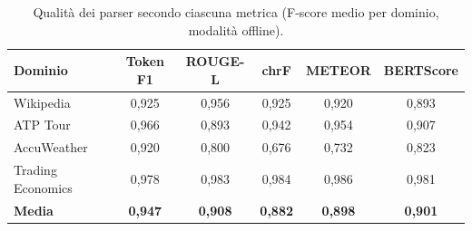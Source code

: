 \begin{table}[htbp]
  \centering
  \small
  \begin{tabular}{lccccc}
    \toprule
    \textbf{Dominio} & \textbf{Token F1} & \textbf{ROUGE-L} & \textbf{chrF} & \textbf{METEOR} & \textbf{BERTScore} \\
    \midrule
    Wikipedia & 0,925 & 0,956 & 0,925 & 0,920 & 0,893 \\
    ATP Tour & 0,966 & 0,893 & 0,942 & 0,954 & 0,907 \\
    AccuWeather & 0,920 & 0,800 & 0,676 & 0,732 & 0,823 \\
    Trading Economics & 0,978 & 0,983 & 0,984 & 0,986 & 0,981 \\
    \midrule
    \textbf{Media} & \textbf{0,947} & \textbf{0,908} & \textbf{0,882} & \textbf{0,898} & \textbf{0,901} \\
    \bottomrule
  \end{tabular}
  \caption{Qualità dei parser secondo ciascuna metrica (F-score medio per dominio, modalità offline).}
  \label{tab:parser-quality}
\end{table}
